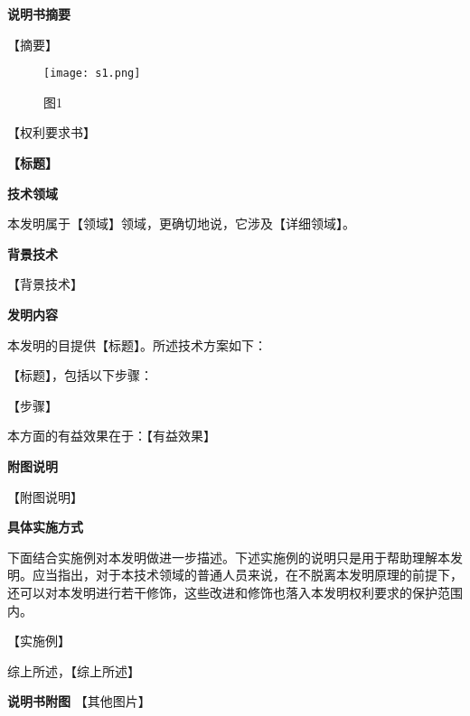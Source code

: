 \documentclass[]{article}
\author{}
\date{}
\begin{document}
    \textbf{说明书摘要}

    【摘要】

    \clearpage

    \begin{figure*}
        \centering
        \texttt{[image: s1.png]}
        \caption{图1}
    \end{figure*}

    \clearpage

    【权利要求书】


    \clearpage
    \begin{center}
        \textbf{【标题】}
    \end{center}

    \textbf{技术领域}

    本发明属于【领域】领域，更确切地说，它涉及【详细领域】。


    \clearpage

    \textbf{背景技术}

    【背景技术】

    \textbf{发明内容}

    本发明的目提供【标题】。所述技术方案如下：

    【标题】，包括以下步骤：

    【步骤】


    本方面的有益效果在于：【有益效果】

    \textbf{附图说明}

    【附图说明】

    \textbf{具体实施方式}

    下面结合实施例对本发明做进一步描述。下述实施例的说明只是用于帮助理解本发明。应当指出，对于本技术领域的普通人员来说，在不脱离本发明原理的前提下，还可以对本发明进行若干修饰，这些改进和修饰也落入本发明权利要求的保护范围内。

    【实施例】


    综上所述，【综上所述】

    \clearpage

    \textbf{说明书附图}
    【其他图片】
\end{document}
